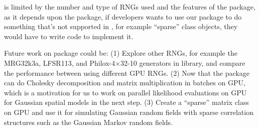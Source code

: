 \documentclass[article,nojss]{jss}\usepackage[]{graphicx}\usepackage[]{color}
\begin{document}

 is limited by the number and type of  RNGs used and the features of the  package, as it depends upon the  package, if developers wants to use our package to do something that's not supported in , for example ``sparse'' class objects, they would have to write  code to implement it.

Future work on  package could be: (1) Explore other RNGs, for example the MRG32k3a, LFSR113, and Philox-4×32-10 generators in  library, and compare the  performance between using different GPU RNGs. (2) Now that the package can do Cholesky decomposition and matrix multiplication in batches on GPU, which is a motivation for us to work on parallel likelihood evaluations on GPU for Gaussian spatial models in the next step. (3) Create a ``sparse'' matrix class on GPU and use it for simulating Gaussian random fields with sparse correlation structures such as the Gaussian Markov random fields.










\newpage












\begin{appendix}

\end{appendix}
\end{document}
